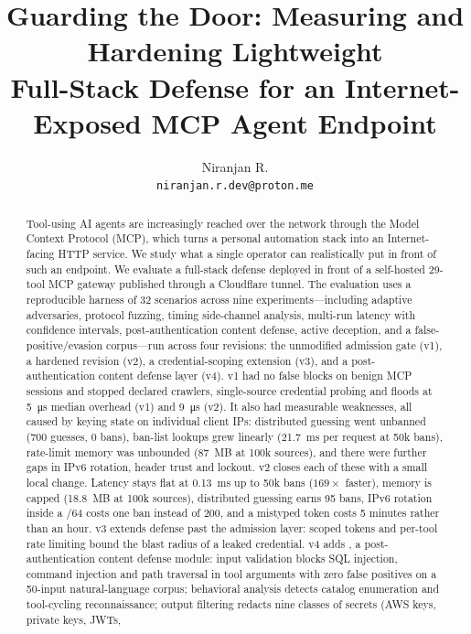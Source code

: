\documentclass[10pt,twocolumn]{article}
\title{\Large\bfseries Guarding the Door: Measuring and Hardening Lightweight\\
Full-Stack Defense for an Internet-Exposed {MCP} Agent Endpoint}
\author{%
  Niranjan R.\\
  \texttt{niranjan.r.dev@proton.me}
}
\date{}
\begin{document}
\maketitle

\begin{abstract}
Tool-using AI agents are increasingly reached over the network through the
Model Context Protocol (MCP), which turns a personal automation stack into an
Internet-facing HTTP service. We study what a single operator can realistically
put in front of such an endpoint. We evaluate a full-stack defense deployed in
front of a self-hosted 29-tool MCP gateway published through a Cloudflare
tunnel. The evaluation uses a reproducible harness of 32 scenarios across nine
experiments---including adaptive adversaries, protocol fuzzing, timing
side-channel analysis, multi-run latency with confidence intervals,
post-authentication content defense, active deception, and a
false-positive/evasion corpus---run across four revisions: the unmodified
admission gate (v1), a hardened revision (v2), a credential-scoping extension
(v3), and a post-authentication content defense layer (v4). v1 had no false
blocks on benign MCP sessions and stopped declared crawlers, single-source
credential probing and floods at \SI{5}{\micro\second} median overhead (v1) and
\SI{9}{\micro\second} (v2). It also
had measurable weaknesses, all caused by keying state on individual client IPs:
distributed guessing went unbanned (700 guesses, 0 bans), ban-list lookups grew
linearly (\SI{21.7}{\milli\second} per request at 50k bans), rate-limit memory
was unbounded (\SI{87}{MB} at 100k sources), and there were further gaps in IPv6
rotation, header trust and lockout. v2 closes each of these with a small local
change. Latency stays flat at \SI{0.13}{\milli\second} up to 50k bans
($169\times$ faster), memory is capped (\SI{18.8}{MB} at 100k sources),
distributed guessing earns 95 bans, IPv6 rotation inside a /64 costs one ban
instead of 200, and a mistyped token costs 5 minutes rather than an hour. v3
extends defense past the admission layer: scoped tokens and per-tool rate
limiting bound the blast radius of a leaked credential. v4 adds
\bastion{}, a post-authentication content defense module: input validation
blocks SQL injection, command injection and path traversal in tool arguments
with zero false positives on a 50-input natural-language corpus; behavioral
analysis detects catalog enumeration and tool-cycling reconnaissance; output
filtering redacts nine classes of secrets (AWS keys, private keys, JWTs,

\end{abstract}
\end{document}
